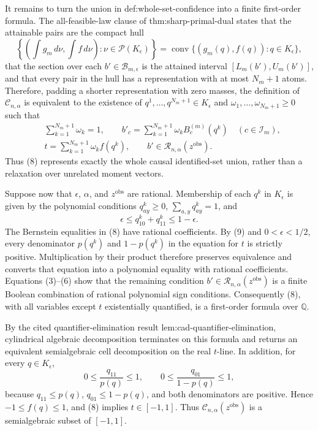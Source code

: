 It remains to turn the union in def:whole-set-confidence into a finite first-order formula.  The all-feasible-law clause of thm:sharp-primal-dual states that the attainable pairs are the compact hull
\[
 \left\{\left(\int g_m\,d\nu,\int f\,d\nu\right):
 \nu\in\mathcal P(K_{\epsilon})\right\}
 =\operatorname{conv}\{(g_m(q),f(q)):q\in K_{\epsilon}\},
\tag{7}
\]
that the section over each \(b'\in\mathcal B_{m,\epsilon}\) is the attained interval \([L_m(b'),U_m(b')]\), and that every pair in the hull has a representation with at most \(N_m+1\) atoms.  Therefore, padding a shorter representation with zero masses, the definition of \(\mathcal C_{n,\alpha}\) is equivalent to the existence of \(q^1,\ldots,q^{N_m+1}\in K_{\epsilon}\) and \(\omega_1,\ldots,\omega_{N_m+1}\geq0\) such that
\[
 \begin{split}
 &\sum_{k=1}^{N_m+1}\omega_k=1,\qquad
 b'_c=\sum_{k=1}^{N_m+1}\omega_k B_c^{(m)}(q^k)
       \quad(c\in\mathcal I_m),\\
 &t=\sum_{k=1}^{N_m+1}\omega_k f(q^k),
 \qquad b'\in\mathcal R_{n,\alpha}(z^{\mathrm{obs}}).
 \end{split}
\tag{8}
\]
Thus (8) represents exactly the whole causal identified-set union, rather than a relaxation over unrelated moment vectors.

Suppose now that \(\epsilon\), \(\alpha\), and \(z^{\mathrm{obs}}\) are rational.  Membership of each \(q^k\) in \(K_{\epsilon}\) is given by the polynomial conditions \(q^k_{ay}\geq0\), \(\sum_{a,y}q^k_{ay}=1\), and
\[
 \epsilon\leq q^k_{10}+q^k_{11}\leq1-\epsilon.
\tag{9}
\]
The Bernstein equalities in (8) have rational coefficients.  By (9) and \(0<\epsilon<1/2\), every denominator \(p(q^k)\) and \(1-p(q^k)\) in the equation for \(t\) is strictly positive.  Multiplication by their product therefore preserves equivalence and converts that equation into a polynomial equality with rational coefficients.  Equations (3)--(6) show that the remaining condition \(b'\in\mathcal R_{n,\alpha}(z^{\mathrm{obs}})\) is a finite Boolean combination of rational polynomial sign conditions.  Consequently (8), with all variables except \(t\) existentially quantified, is a first-order formula over \(\mathbb Q\).

By the cited quantifier-elimination result lem:cad-quantifier-elimination, cylindrical algebraic decomposition terminates on this formula and returns an equivalent semialgebraic cell decomposition on the real \(t\)-line.  In addition, for every \(q\in K_{\epsilon}\),
\[
 0\leq\frac{q_{11}}{p(q)}\leq1,
 \qquad
 0\leq\frac{q_{01}}{1-p(q)}\leq1,
\]
because \(q_{11}\leq p(q)\), \(q_{01}\leq1-p(q)\), and both denominators are positive.  Hence \(-1\leq f(q)\leq1\), and (8) implies \(t\in[-1,1]\).  Thus \(\mathcal C_{n,\alpha}(z^{\mathrm{obs}})\) is a semialgebraic subset of \([-1,1]\).


